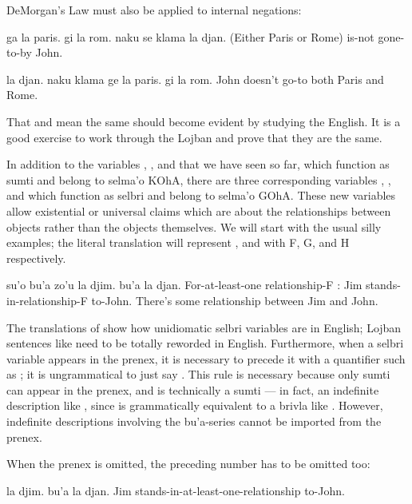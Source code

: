 DeMorgan's Law must also be applied to internal 
    negations:
\begin{example}
ga la paris. gi la rom. naku se klama la djan.\n
(Either Paris or Rome) is-not gone-to-by John.
\end{example}

\begin{example}
la djan. naku klama ge la paris. gi la rom.\n
John doesn't go-to both Paris and Rome.
\end{example}

That  and  mean the same should become
    evident by studying the English. It is a good exercise to work
    through the Lojban and prove that they are the same.



In addition to the variables , , and  that
    we have seen so far, which function as sumti and belong to
    selma'o KOhA, there are three corresponding variables ,
    , and  which function as selbri and belong to
    selma'o GOhA. These new variables allow existential or
    universal claims which are about the relationships between
    objects rather than the objects themselves. We will start with
    the usual silly examples; the literal translation will
    represent ,  and  with F, G, and H
    respectively.
\begin{example}
su'o bu'a zo'u\n
\T	la djim. bu'a la djan.\n
For-at-least-one relationship-F :\n
\T	Jim stands-in-relationship-F to-John.\n
There's some relationship between Jim and John.
\end{example}

The translations of  show how
    unidiomatic selbri variables are in English; Lojban sentences
    like  need to be totally
    reworded in English. Furthermore, when a selbri variable
    appears in the prenex, it is necessary to precede it with a
    quantifier such as ; it is ungrammatical to just say
    . This rule is necessary because only sumti can
    appear in the prenex, and  is technically a sumti
    --- in fact, an indefinite description like , since
     is grammatically equivalent to a brivla like
    . However, indefinite descriptions involving the
    bu'a-series cannot be imported from the prenex. 

When the prenex is omitted, the preceding number has to be
    omitted too:
\begin{example}
la djim. bu'a la djan.\n
Jim stands-in-at-least-one-relationship to-John.
\end{example}

